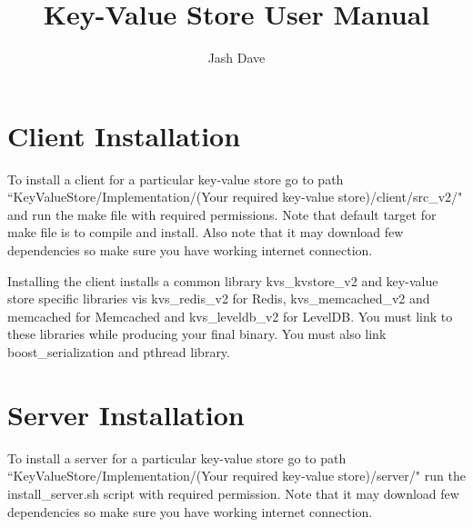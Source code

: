 \documentclass[11pt]{article}
\title{\textbf{Key-Value Store User Manual}}
\author{Jash Dave}
\date{}
\begin{document}
\maketitle

\section{Client Installation}
To install a client for a particular key-value store go to path \\ ``KeyValueStore/Implementation/(Your required key-value store)/client/src\_v2/" and run the make file with required permissions. Note that default target for make file is to compile and install. Also note that it may download few dependencies so make sure you have working internet connection.

Installing the client installs a common library kvs\_kvstore\_v2 and key-value store specific libraries vis kvs\_redis\_v2 for Redis, kvs\_memcached\_v2 and memcached for Memcached and kvs\_leveldb\_v2 for LevelDB. You must link to these libraries while producing your final binary. You must also link boost\_serialization and pthread library.

\section{Server Installation}
To install a server for a particular key-value store go to path \\ ``KeyValueStore/Implementation/(Your required key-value store)/server/" run the install\_server.sh script with required permission. Note that it may download few dependencies so make sure you have working internet connection.
\end{document}
